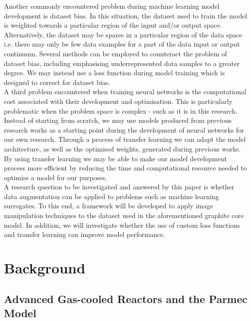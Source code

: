\noindent
Another commonly encountered problem during machine learning model development is dataset bias. In this situation, the dataset used to train the model is weighted towards a particular region of the input and/or output space. Alternatively, the dataset may be sparse in a particular region of the data space i.e. there may only be few data examples for a part of the data input or output continuum. Several methods can be employed to counteract the problem of dataset bias, including emphasising underrepresented data samples to a greater degree. We may instead use a loss function during model training which is designed to correct for dataset bias. 
\\

\noindent
A third problem encountered when training neural networks is the computational cost associated with their development and optimisation. This is particularly problematic when the problem space is complex - such as it is in this research. Instead of starting from scratch, we may use models produced from previous research works as a starting point during the development of neural networks for our own research. Through a process of transfer learning \cite{torrey2010transfer} we can adapt the model architecture, as well as the optimised weights, generated during previous works. By using transfer learning we may be able to make our model development process more efficient by reducing the time and computational resource needed to optimise a model for our purposes. 
\\

\noindent
A research question to be investigated and answered by this paper is whether data augmentation can be applied to problems such as machine learning surrogates. To this end, a framework will be developed to apply image manipulation techniques to the dataset used in the aforementioned graphite core model. In addition, we will investigate whether the use of custom loss functions and transfer learning can improve model performance.


\section{Background} \label{Background}

\subsection{Advanced Gas-cooled Reactors and the Parmec Model} \label{Parmec}


